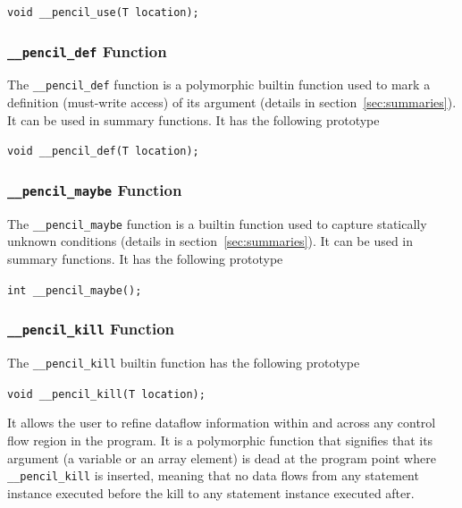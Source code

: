   \lstinline!void __pencil_use(T location);!



\subsubsection{\texttt{\_\_pencil\_def} Function}

  The \lstinline!__pencil_def! function is a polymorphic
  builtin function used to mark a definition (must-write
  access) of its argument (details in
  section~\ref{sec:summaries}).
  It can be used in summary functions.
  It has the following prototype
  
  \lstinline!void __pencil_def(T location);!


\subsubsection{\texttt{\_\_pencil\_maybe} Function}

  The \lstinline!__pencil_maybe! function is
  a builtin function used to capture statically unknown conditions
  (details in section~\ref{sec:summaries}).
  It can be used in summary functions.
  It has the following prototype
  
  \lstinline!int __pencil_maybe();!

\subsubsection{\label{sec:kill}\texttt{\_\_pencil\_kill} Function}
  
The \lstinline!__pencil_kill! builtin function has the following prototype

  \lstinline!void __pencil_kill(T location);!

  It allows the user to refine dataflow information
  within and across any control flow region in the program.
  It is a polymorphic function that signifies that its argument
  (a variable or an array element) is dead at the program point
  where \lstinline!__pencil_kill! is inserted, meaning that no data
  flows from any statement instance executed before the kill to any
  statement instance executed after.


